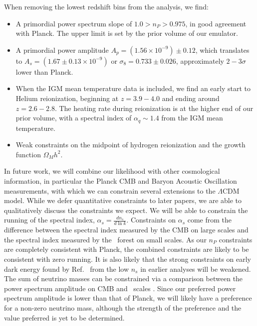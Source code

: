 When removing the lowest redshift bins from the analysis, we find:
\begin{itemize}
    \item A primordial power spectrum slope of $1.0 > n_P > 0.975$, in good agreement with Planck. The upper limit is set by the prior volume of our emulator.
    \item A primordial power amplitude $A_p=\left(1.56\times10^{-9}\right) \pm 0.12$, which translates to $A_s=\left(1.67\pm0.13\times10^{-9}\right)$ or $\sigma_8 = 0.733 \pm 0.026$, approximately $2-3\sigma$ lower than Planck.
    \item When the IGM mean temperature data is included, we find an early start to Helium reionization, beginning at $z = 3.9 - 4.0$ and ending around $z=2.6-2.8$. The heating rate during reionization is at the higher end of our prior volume, with a spectral index of $\alpha_q \sim 1.4$ from the IGM mean temperature.  
    \item Weak constraints on the midpoint of hydrogen reionization and the growth function $\Omega_M h^2$.
\end{itemize}


In future work, we will combine our \Lya likelihood with other cosmological information, in particular the Planck CMB and Baryon Acoustic Oscillation measurements, with which we can constrain several extensions to the $\Lambda$CDM model. While we defer quantitative constraints to later papers, we are able to qualitatively discuss the constraints we expect. We will be able to constrain the running of the spectral index, $\alpha_s = \frac{d n_s}{d \ln k}$. Constraints on $\alpha_s$ come from the difference between the spectral index measured by the CMB on large scales and the spectral index measured by the \Lya~forest on small scales. As our $n_P$ constraints are completely consistent with Planck, the combined constraints are likely to be consistent with zero running. It is also likely that the strong constraints on early dark energy found by Ref.~\cite{2023arXiv230300746G} from the low $n_s$ in earlier analyses will be weakened. The sum of neutrino masses can be constrained via a comparison between the power spectrum amplitude on CMB and \Lya~scales \cite{2020JCAP...04..025P}. Since our preferred power spectrum amplitude is lower than that of Planck, we will likely have a preference for a non-zero neutrino mass, although the strength of the preference and the value preferred is yet to be determined.

